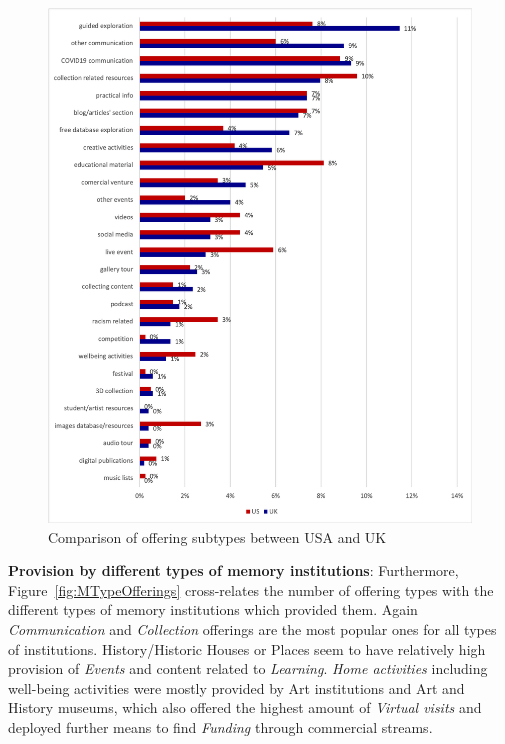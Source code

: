 \documentclass{egpubl}
\begin{document}
\begin{figure}[h]
  \centering
  \includegraphics[width=\linewidth]{images/subtypeNEW.png}
  \caption{\label{fig:SubTypeComparisonUKUS}
           Comparison of offering subtypes between USA and UK}
\end{figure}

 





\noindent \textbf{Provision by different types of memory institutions}: Furthermore, Figure~\ref{fig:MTypeOfferings} cross-relates the number of offering types with the different types of memory institutions which provided them. Again \textit{Communication} and \textit{Collection} offerings are the most popular ones for all types of institutions. History/Historic Houses or Places seem to have relatively high provision of \textit{Events} and content related to \textit{Learning}. \textit{Home activities} including well-being activities were mostly provided by Art institutions and Art and History museums, which also offered the highest amount of \textit{Virtual visits} and deployed further means to find \textit{Funding} through commercial streams.
\end{document}
